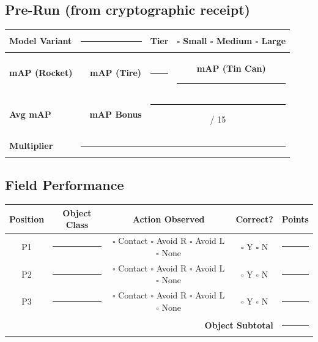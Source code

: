 \documentclass[a4]{article}
\begin{document}
\subsection*{Pre-Run (from cryptographic receipt)}

\begin{table}[H]
\centering
\begin{tabular}{|l|c|c|c|c|}
\hline
\textbf{Model Variant} & \multicolumn{2}{c|}{\rule{3cm}{0.4pt}} & \textbf{Tier} & $\square$ Small \quad $\square$ Medium \quad $\square$ Large \\
\hline
\textbf{mAP (Rocket)} & \rule{2cm}{0.4pt} & \textbf{mAP (Tire)} & \rule{2cm}{0.4pt} & \textbf{mAP (Tin Can)} \quad \rule{2cm}{0.4pt} \\
\hline
\textbf{Avg mAP} & \rule{2cm}{0.4pt} & \textbf{mAP Bonus} & \multicolumn{2}{c|}{\rule{2cm}{0.4pt} / 15} \\
\hline
\textbf{Multiplier} & \multicolumn{4}{c|}{\rule{2cm}{0.4pt}} \\
\hline
\end{tabular}
\end{table}

\subsection*{Field Performance}

\begin{table}[H]
\centering
\begin{tabular}{|c|c|c|c|c|}
\hline
\textbf{Position} & \textbf{Object Class} & \textbf{Action Observed} & \textbf{Correct?} & \textbf{Points} \\
\hline
P1 & \rule{2cm}{0.4pt} & $\square$ Contact \quad $\square$ Avoid R \quad $\square$ Avoid L \quad $\square$ None & $\square$ Y $\square$ N & \rule{1.5cm}{0.4pt} \\
\hline
P2 & \rule{2cm}{0.4pt} & $\square$ Contact \quad $\square$ Avoid R \quad $\square$ Avoid L \quad $\square$ None & $\square$ Y $\square$ N & \rule{1.5cm}{0.4pt} \\
\hline
P3 & \rule{2cm}{0.4pt} & $\square$ Contact \quad $\square$ Avoid R \quad $\square$ Avoid L \quad $\square$ None & $\square$ Y $\square$ N & \rule{1.5cm}{0.4pt} \\
\hline
\multicolumn{4}{|r|}{\textbf{Object Subtotal}} & \rule{1.5cm}{0.4pt} \\
\hline
\end{tabular}
\end{table}
\end{document}
